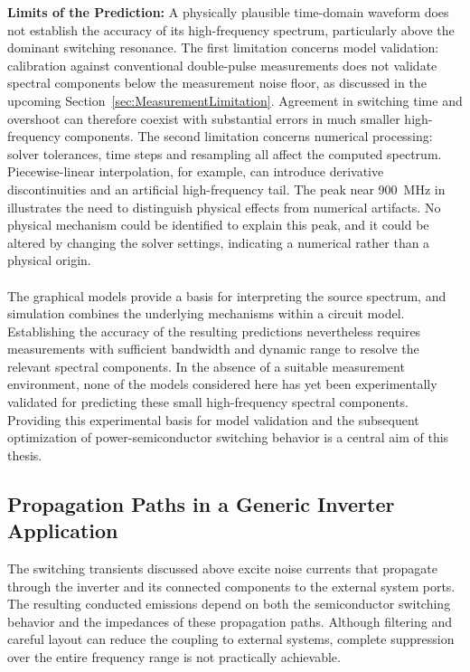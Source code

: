 \textbf{Limits of the Prediction:}
A physically plausible time-domain waveform does not establish the accuracy of its high-frequency spectrum, particularly above the dominant switching resonance.
The first limitation concerns model validation: calibration against conventional double-pulse measurements does not validate spectral components below the measurement noise floor, as discussed in the upcoming Section~\ref{sec:MeasurementLimitation}.
Agreement in switching time and overshoot can therefore coexist with substantial errors in much smaller high-frequency components.
The second limitation concerns numerical processing: solver tolerances, time steps and resampling all affect the computed spectrum.
Piecewise-linear interpolation, for example, can introduce derivative discontinuities and an artificial high-frequency tail.
The peak near \SI{900}{MHz} in  illustrates the need to distinguish physical effects from numerical artifacts.
No physical mechanism could be identified to explain this peak, and it could be altered by changing the solver settings, indicating a numerical rather than a physical origin.
\\
\\
The graphical models provide a basis for interpreting the source spectrum, and simulation combines the underlying mechanisms within a circuit model.
Establishing the accuracy of the resulting predictions nevertheless requires measurements with sufficient bandwidth and dynamic range to resolve the relevant spectral components.
In the absence of a suitable measurement environment, none of the models considered here has yet been experimentally validated for predicting these small high-frequency spectral components.
Providing this experimental basis for model validation and the subsequent optimization of power-semiconductor switching behavior is a central aim of this thesis.

\FloatBarrier
\subsection{Propagation Paths in a Generic Inverter Application}
The switching transients discussed above excite noise currents that propagate through the inverter and its connected components to the external system ports.
The resulting conducted emissions depend on both the semiconductor switching behavior and the impedances of these propagation paths.
Although filtering and careful layout can reduce the coupling to external systems, complete suppression over the entire frequency range is not practically achievable.

